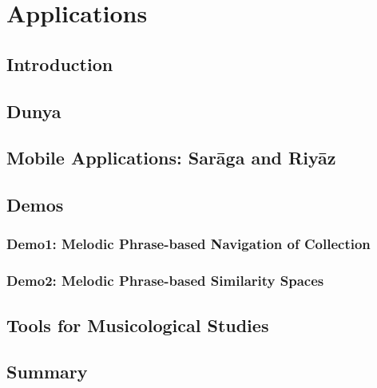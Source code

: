 
\chapter{Applications}
\label{sec:applicatoins}

\section{Introduction}
\section{Dunya}
\section{Mobile Applications: Sar\={a}ga and Riy\={a}z}
\section{Demos}
\subsection*{Demo1: Melodic Phrase-based Navigation of Collection}
\subsection*{Demo2: Melodic Phrase-based Similarity Spaces}
\section{Tools for Musicological Studies}
\section{Summary}



